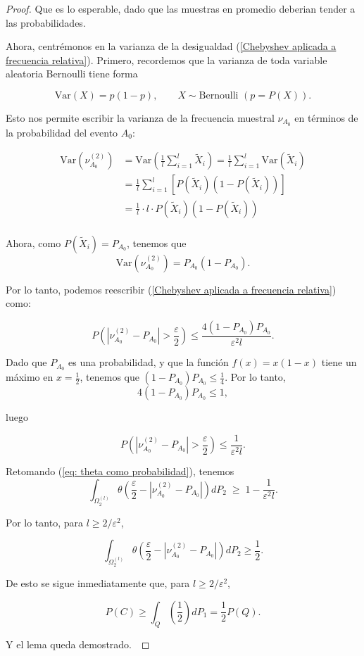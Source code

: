 \documentclass{report}
\begin{document}
\begin{proof}
Que es lo esperable, dado que las muestras en promedio deberian tender a las probabilidades.\newline

Ahora, centrémonos en la varianza de la desigualdad (\ref{Chebyshev aplicada a frecuencia relativa}). Primero,
recordemos que la varianza de toda variable aleatoria Bernoulli tiene forma

\[
     \text{Var}(X) = p(1-p), \qquad X \sim \text{Bernoulli } (p=P(X)).
\]
\bigskip

Esto nos permite escribir la varianza de la frecuencia muestral $\nu_{A_0}$ en términos de la probabilidad del evento $A_0$:

\[
\begin{aligned}
    \text{Var}\left(\nu_{A_0}^{(2)}\right) &=\text{Var}\left(\frac{1}{l}\sum_{i=1}^l \tilde{X}_i\right)
    = \frac{1}{l}\sum_{i=1}^l \text{Var}\left(\tilde{X}_i\right)\\
    &= \frac{1}{l}\sum_{i=1}^l \left[P(\tilde{X}_i)(1-P(\tilde{X}_i))\right]\\
    &=\frac{1}{l} \cdot l\cdot P(\tilde{X}_i)(1-P(\tilde{X}_i)) \\
\end{aligned}
\]

Ahora, como $P(\tilde{X}_i) = P_{A_0}$, tenemos que 
\[
    \text{Var}\left(\nu_{A_0}^{(2)}\right) = P_{A_0}(1-P_{A_0}).
\]

Por lo tanto, podemos reescribir (\ref{Chebyshev aplicada a frecuencia relativa}) como:

\[
P\left( \left| \nu^{(2)}_{A_0} - P_{A_0} \right| > \frac{\varepsilon}{2} \right) 
\leq \frac{4(1 - P_{A_0}) P_{A_0}}{\varepsilon^2 l}.
\]\newline

Dado que $P_{A_0}$ es una probabilidad, y que la función $f(x)=x(1-x)$ tiene un máximo en $x=\frac{1}{2}$, tenemos que
$(1 - P_{A_0}) P_{A_0} \leq \frac{1}{4}$. Por lo tanto,
\[4(1 - P_{A_0}) P_{A_0} \leq 1, 
\]

luego

\[
P\left( \left| \nu^{(2)}_{A_0} - P_{A_0} \right| > \frac{\varepsilon}{2} \right) \leq \frac{1}{\varepsilon^2 l}.
\]\newline

Retomando (\ref{eq: theta como probabilidad}), tenemos 
\[
    \int_{ \Omega_2^{(l)}}  \theta\left(\frac{\varepsilon}{2} - |\nu^{(2)}_{A_0}-P_{A_0}|\right) dP_2 \;\geq\; 1 - \frac{1}{\varepsilon^2 l}.
    \]

Por lo tanto, para \( l \geq 2 / \varepsilon^2 \),

\[
\int_{\Omega_2^{(l)}} \theta \left( \frac{\varepsilon}{2} - \left| \nu^{(2)}_{A_0} - P_{A_0} \right| \right) dP_2 \geq \frac{1}{2}.
\]

De esto se sigue inmediatamente que, para \( l \geq 2 / \varepsilon^2 \),

\[
P(C) \geq \int_{Q} \left( \frac{1}{2} \right) dP_1  =
 \frac{1}{2} P(Q).
\]

Y el lema queda demostrado.\



\end{proof}
\end{document}
